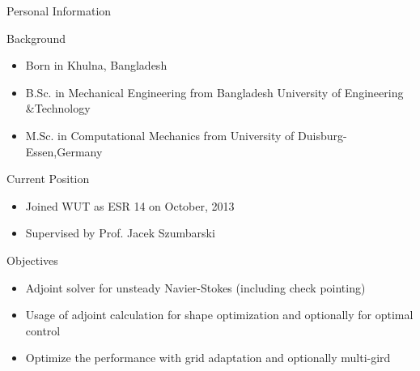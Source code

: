 
\newcommand{\ltx}[1]{{\tt \textbackslash#1}}
\begin{frame}{Personal Information}
\begin{block}{Background}
\begin{itemize}
\item Born in Khulna, Bangladesh
\item B.Sc. in Mechanical Engineering from Bangladesh University of Engineering \&Technology
\item M.Sc. in Computational Mechanics from University of Duisburg-Essen,Germany
\end{itemize}
\end{block}
\begin{block}{Current Position}
\begin{itemize}
\item Joined WUT as ESR 14 on October, 2013
\item Supervised by Prof. Jacek Szumbarski
\end{itemize}
\end{block}
\end{frame}

\begin{frame}{Objectives}
\begin{block}{}
\begin{itemize}
\item Adjoint solver for unsteady Navier-Stokes (including check pointing)
\item Usage of adjoint calculation for shape optimization and optionally for optimal control
\item Optimize the performance with grid adaptation and optionally multi-gird
\end{itemize}
\end{block}
\end{frame}

